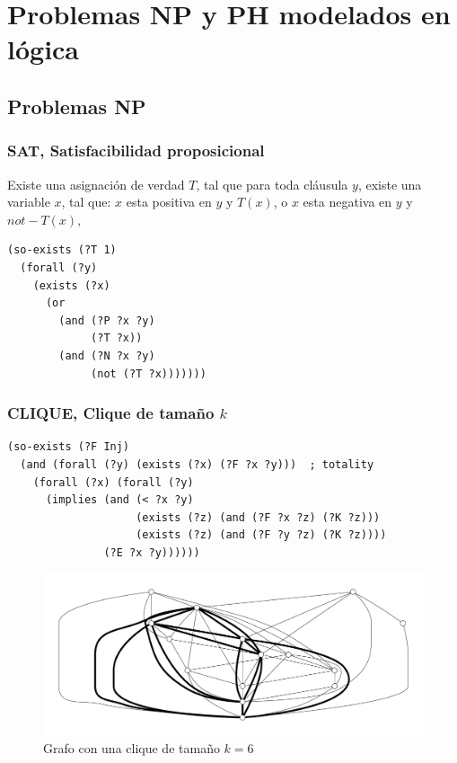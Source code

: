 
\chapter{Problemas NP y PH modelados en lógica}
\label{apendiceA}

\section{Problemas NP}

\subsection{SAT, Satisfacibilidad proposicional}
Existe una asignación de verdad $T$, tal que para toda cláusula $y$, existe una variable $x$, tal que:
$x$ esta positiva en $y$ y $T(x)$, o $x$ esta negativa en $y$ y $not-T(x)$,
\begin{verbatim}
(so-exists (?T 1)
  (forall (?y)
    (exists (?x)
      (or
        (and (?P ?x ?y)
             (?T ?x)) 
        (and (?N ?x ?y)
             (not (?T ?x)))))))
\end{verbatim}

\subsection{CLIQUE, Clique de tamaño $k$}

\begin{verbatim}
(so-exists (?F Inj)
  (and (forall (?y) (exists (?x) (?F ?x ?y)))  ; totality
    (forall (?x) (forall (?y)
      (implies (and (< ?x ?y)
                    (exists (?z) (and (?F ?x ?z) (?K ?z)))
                    (exists (?z) (and (?F ?y ?z) (?K ?z))))
               (?E ?x ?y))))))
\end{verbatim}
\begin{figure}[h!]
\centering
\includegraphics[width=\textwidth]{figuras/clique.pdf}
\caption[Grafo con una \textit{clique} de tamaño $k = 6$]{Grafo con una clique de tamaño
$k = 6$}
\label{clique}  
\end{figure}

